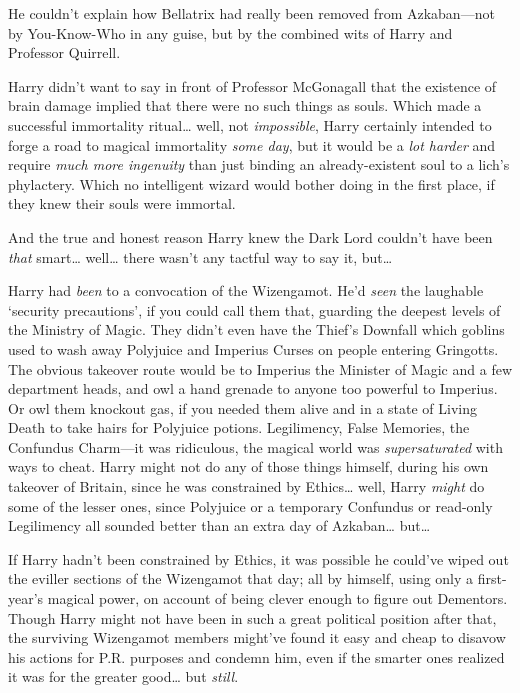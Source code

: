 He couldn't explain how Bellatrix had really been removed from Azkaban—not by You-Know-Who in any guise, but by the combined wits of Harry and Professor Quirrell.

Harry didn't want to say in front of Professor McGonagall that the existence of brain damage implied that there were no such things as souls. Which made a successful immortality ritual{\ldots} well, not \emph{impossible}, Harry certainly intended to forge a road to magical immortality \emph{some day}, but it would be a \emph{lot harder} and require \emph{much more ingenuity} than just binding an already-existent soul to a lich's phylactery. Which no intelligent wizard would bother doing in the first place, if they knew their souls were immortal.

And the true and honest reason Harry knew the Dark Lord couldn't have been \emph{that} smart{\ldots} well{\ldots} there wasn't any tactful way to say it, but{\ldots}

Harry had \emph{been} to a convocation of the Wizengamot. He'd \emph{seen} the laughable `security precautions', if you could call them that, guarding the deepest levels of the Ministry of Magic. They didn't even have the Thief's Downfall which goblins used to wash away Polyjuice and Imperius Curses on people entering Gringotts. The obvious takeover route would be to Imperius the Minister of Magic and a few department heads, and owl a hand grenade to anyone too powerful to Imperius. Or owl them knockout gas, if you needed them alive and in a state of Living Death to take hairs for Polyjuice potions. Legilimency, False Memories, the Confundus Charm—it was ridiculous, the magical world was \emph{supersaturated} with ways to cheat. Harry might not do any of those things himself, during his own takeover of Britain, since he was constrained by Ethics{\ldots} well, Harry \emph{might} do some of the lesser ones, since Polyjuice or a temporary Confundus or read-only Legilimency all sounded better than an extra day of Azkaban{\ldots} but{\ldots}

If Harry hadn't been constrained by Ethics, it was possible he could've wiped out the eviller sections of the Wizengamot that day; all by himself, using only a first-year's magical power, on account of being clever enough to figure out Dementors. Though Harry might not have been in such a great political position after that, the surviving Wizengamot members might've found it easy and cheap to disavow his actions for P.R. purposes and condemn him, even if the smarter ones realized it was for the greater good{\ldots} but \emph{still}.

